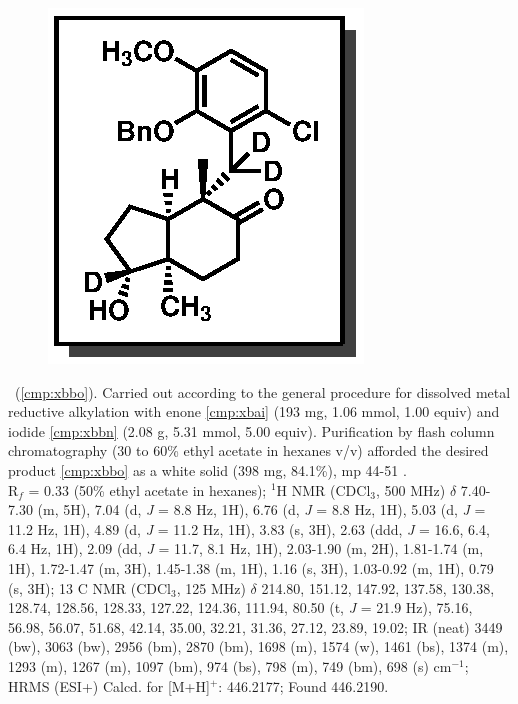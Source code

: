 \begin{figure}
  \vspace{-15pt}
  \begin{center}
    \includegraphics[scale=0.8]{chp_singlecarbon/images/xbbo}
  \end{center}
  \vspace{-30pt}
\end{figure}\noindent \textbf{\CMPxbbo}\ (\ref{cmp:xbbo}). Carried out according to the general procedure
for dissolved metal reductive alkylation with enone \ref{cmp:xbai} (193
mg, 1.06 mmol, 1.00 equiv) and iodide \ref{cmp:xbbn} (2.08 g, 5.31 mmol, 5.00
equiv). Purification by flash column chromatography (30 to 60\% ethyl
acetate in hexanes v/v) afforded the desired product \ref{cmp:xbbo} as a white solid
(398 mg, 84.1\%), mp 44-51 \degc. \\
R$_f$ = 0.33 (50\% ethyl acetate in hexanes); $^1$H NMR (CDCl$_3$, 500 MHz) $\delta$ 7.40-7.30 (m, 5H), 7.04
(d, \textit{J} = 8.8 Hz, 1H), 6.76 (d, \textit{J} = 8.8 Hz, 1H), 5.03 (d, \textit{J} = 11.2 Hz, 1H), 4.89 (d, \textit{J} = 11.2 Hz, 1H),
3.83 (s, 3H), 2.63 (ddd, \textit{J} = 16.6, 6.4, 6.4 Hz, 1H), 2.09 (dd, \textit{J} = 11.7, 8.1 Hz, 1H), 2.03-1.90 (m,
2H), 1.81-1.74 (m, 1H), 1.72-1.47 (m, 3H), 1.45-1.38 (m, 1H), 1.16 (s, 3H), 1.03-0.92 (m, 1H),
0.79 (s, 3H);
13
C NMR (CDCl$_3$, 125 MHz) $\delta$ 214.80, 151.12, 147.92, 137.58, 130.38, 128.74,
128.56, 128.33, 127.22, 124.36, 111.94, 80.50 (t, \textit{J} = 21.9 Hz), 75.16, 56.98, 56.07, 51.68, 42.14,
35.00, 32.21, 31.36, 27.12, 23.89, 19.02; IR (neat) 3449 (bw), 3063 (bw), 2956 (bm), 2870 (bm),
1698 (m), 1574 (w), 1461 (bs), 1374 (m), 1293 (m), 1267 (m), 1097 (bm), 974 (bs), 798 (m), 749
(bm), 698 (s) cm$^{-1}$; HRMS (ESI+) Calcd. for  [M+H]$^+$: 446.2177; Found 446.2190.

